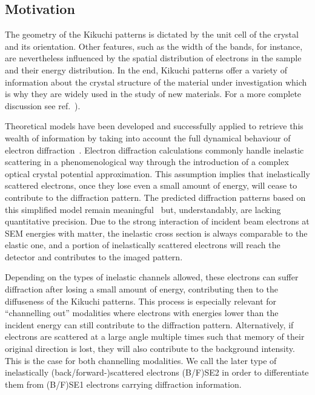 \subsection{Motivation}
\label{sec:introduction}


The geometry of the Kikuchi patterns is dictated by the unit cell of the crystal and its orientation. Other features, such as the width of the bands, for instance, are nevertheless influenced by the spatial distribution of electrons in the sample and their energy distribution. In the end, Kikuchi patterns offer a variety of information about the crystal structure of the material under investigation which is why they are widely used in the study of new materials. For a more complete discussion see ref.~\cite{winkelmann2017}).


Theoretical models have been developed and successfully applied to retrieve this wealth of information by taking into account the full dynamical behaviour of electron diffraction~\cite{winkelmann2007, degraef2014q, singh2016}. Electron diffraction calculations commonly handle inelastic scattering in a phenomenological way through the introduction of a complex optical crystal potential approximation. This assumption implies that inelastically scattered electrons, once they lose even a small amount of energy, will cease to contribute to the diffraction pattern. The predicted diffraction patterns based on this simplified model remain meaningful~\cite{howie1963} but, understandably, are lacking quantitative precision. Due to the strong interaction of incident beam electrons at SEM energies with matter, the inelastic cross section is always comparable to the elastic one, and a portion of inelastically scattered electrons will reach the detector and contributes to the imaged pattern. 

Depending on the types of inelastic channels allowed, these electrons can suffer diffraction after losing a small amount of energy, contributing then to the diffuseness of the Kikuchi patterns. This process is especially relevant for ``channelling out'' modalities where electrons with energies lower than the incident energy can still contribute to the diffraction pattern. Alternatively, if electrons are scattered at a large angle multiple times such that memory of their original direction is lost, they will also contribute to the background intensity. This is the case for both channelling modalities. We call the later type of inelastically (back/forward-)scattered electrons (B/F)SE2 in order to differentiate them from (B/F)SE1 electrons carrying diffraction information.

